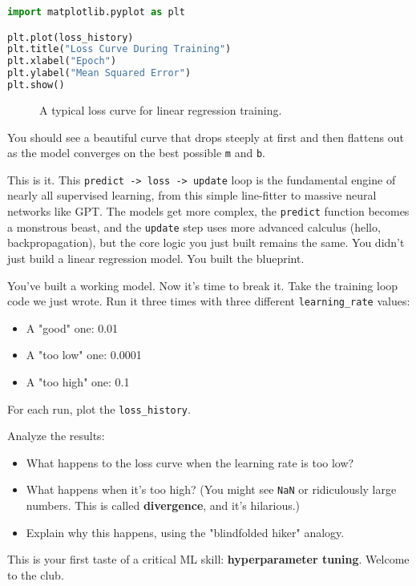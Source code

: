 \documentclass[11pt, letterpaper, openany]{book}
\begin{document}
\begin{lstlisting}[language=Python]
import matplotlib.pyplot as plt

plt.plot(loss_history)
plt.title("Loss Curve During Training")
plt.xlabel("Epoch")
plt.ylabel("Mean Squared Error")
plt.show()
\end{lstlisting}

\begin{figure}[h!]
\centering
{}
\caption{A typical loss curve for linear regression training.}
\end{figure}

You should see a beautiful curve that drops steeply at first and then flattens out as the model converges on the best possible \texttt{m} and \texttt{b}.

This is it. This \texttt{predict -> loss -> update} loop is the fundamental engine of nearly all supervised learning, from this simple line-fitter to massive neural networks like GPT. The models get more complex, the \texttt{predict} function becomes a monstrous beast, and the \texttt{update} step uses more advanced calculus (hello, backpropagation), but the core logic you just built remains the same. You didn't just build a linear regression model. You built the blueprint.

\begin{challengebox}
You've built a working model. Now it's time to break it.
Take the training loop code we just wrote.
Run it three times with three different \texttt{learning\_rate} values:
\begin{itemize}
    \item A "good" one: 0.01
    \item A "too low" one: 0.0001
    \item A "too high" one: 0.1
\end{itemize}
For each run, plot the \texttt{loss\_history}.

Analyze the results:
\begin{itemize}
    \item What happens to the loss curve when the learning rate is too low?
    \item What happens when it's too high? (You might see \texttt{NaN} or ridiculously large numbers. This is called \textbf{divergence}, and it's hilarious.)
    \item Explain why this happens, using the "blindfolded hiker" analogy.
\end{itemize}
This is your first taste of a critical ML skill: \textbf{hyperparameter tuning}. Welcome to the club.
\end{challengebox}
\end{document}
